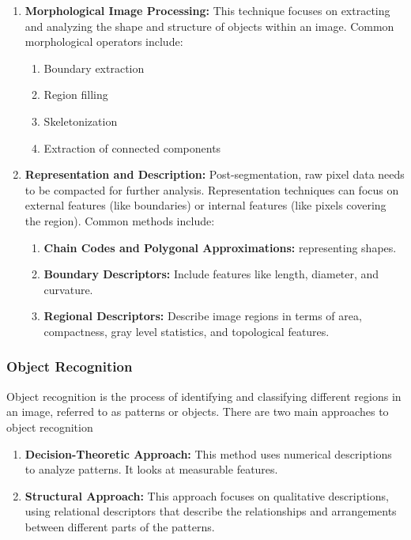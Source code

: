 \documentclass[12pt,oneside,openright,a4paper]{cpe-english-project}
\begin{document}
\begin{enumerate}
	\newpage %
	\item \textbf{Morphological Image Processing:} This technique focuses on extracting and analyzing the shape and structure of objects within an image. Common morphological operators include:
	\begin{enumerate}
		\item Boundary extraction
		\item Region filling
		\item Skeletonization
		\item Extraction of connected components
	\end{enumerate}
	\item \textbf{Representation and Description:} Post-segmentation, raw pixel data needs to be compacted for further analysis. Representation techniques can focus on external features (like boundaries) or internal features (like pixels covering the region). Common methods include:
	\begin{enumerate}
		\item \textbf{Chain Codes and Polygonal Approximations:} representing shapes.
		\item \textbf{Boundary Descriptors:} Include features like length, diameter, and curvature.
		\item \textbf{Regional Descriptors:} Describe image regions in terms of area, compactness, gray level statistics, and topological features.
	\end{enumerate}
\end{enumerate}

\subsubsection{Object Recognition} Object recognition is the process of identifying and classifying different regions in an image, referred to as patterns or objects. There are two main approaches to object recognition

\begin{enumerate}
	\item \textbf{Decision-Theoretic Approach:} This method uses numerical descriptions to analyze patterns. It looks at measurable features.
	\item \textbf{Structural Approach:} This approach focuses on qualitative descriptions, using relational descriptors that describe the relationships and arrangements between different parts of the patterns.
\end{enumerate}
 
\end{document}
